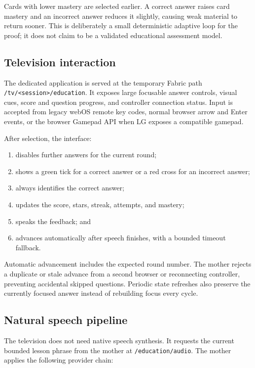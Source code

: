 \documentclass[11pt,a4paper]{article}
\begin{document}
Cards with lower mastery are selected earlier.  A correct answer raises card
mastery and an incorrect answer reduces it slightly, causing weak material to
return sooner.  This is deliberately a small deterministic adaptive loop for
the proof; it does not claim to be a validated educational assessment model.

\subsection{Television interaction}

The dedicated application is served at the temporary Fabric path
\texttt{/tv/<session>/education}.  It exposes large focusable answer controls,
visual cues, score and question progress, and controller connection status.
Input is accepted from legacy webOS remote key codes, normal browser arrow and
Enter events, or the browser Gamepad API when LG exposes a compatible gamepad.

After selection, the interface:

\begin{enumerate}[leftmargin=*,label=\arabic*.]
  \item disables further answers for the current round;
  \item shows a green tick for a correct answer or a red cross for an
        incorrect answer;
  \item always identifies the correct answer;
  \item updates the score, stars, streak, attempts, and mastery;
  \item speaks the feedback; and
  \item advances automatically after speech finishes, with a bounded timeout
        fallback.
\end{enumerate}

Automatic advancement includes the expected round number.  The mother rejects
a duplicate or stale advance from a second browser or reconnecting controller,
preventing accidental skipped questions.  Periodic state refreshes also
preserve the currently focused answer instead of rebuilding focus every cycle.

\subsection{Natural speech pipeline}

The television does not need native speech synthesis.  It requests the current
bounded lesson phrase from the mother at
\texttt{/education/audio}.  The mother applies the following provider chain:
\end{document}
